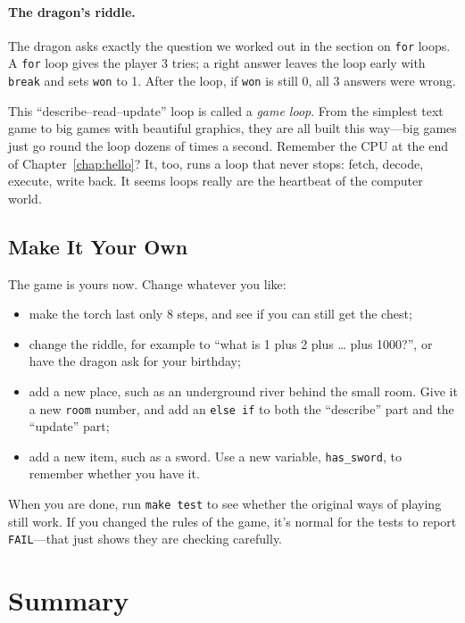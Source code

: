 \paragraph{The dragon's riddle.} The dragon asks exactly the question we worked out in the section on \texttt{for} loops. A \texttt{for} loop gives the player 3 tries; a right answer leaves the loop early with \texttt{break} and sets \texttt{won} to 1. After the loop, if \texttt{won} is still 0, all 3 answers were wrong.

This ``describe--read--update'' loop is called a \emph{game loop}. From the simplest text game to big games with beautiful graphics, they are all built this way---big games just go round the loop dozens of times a second. Remember the CPU at the end of Chapter~\ref{chap:hello}? It, too, runs a loop that never stops: fetch, decode, execute, write back. It seems loops really are the heartbeat of the computer world.

\subsection{Make It Your Own}

The game is yours now. Change whatever you like:
\begin{itemize}
  \item make the torch last only 8 steps, and see if you can still get the chest;
  \item change the riddle, for example to ``what is 1 plus 2 plus \ldots{} plus 1000?'', or have the dragon ask for your birthday;
  \item add a new place, such as an underground river behind the small room. Give it a new \texttt{room} number, and add an \texttt{else if} to both the ``describe'' part and the ``update'' part;
  \item add a new item, such as a sword. Use a new variable, \texttt{has\_sword}, to remember whether you have it.
\end{itemize}
When you are done, run \texttt{make test} to see whether the original ways of playing still work. If you changed the rules of the game, it's normal for the tests to report \texttt{FAIL}---that just shows they are checking carefully.

\section{Summary}

